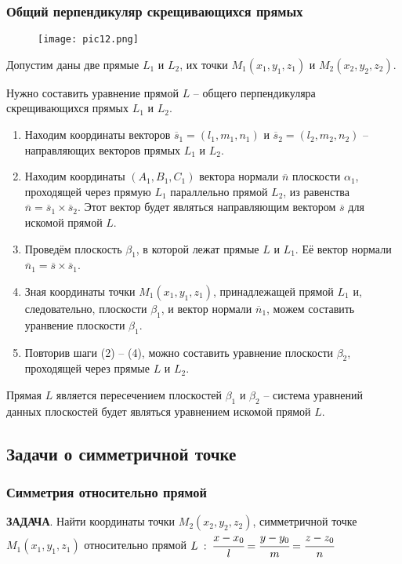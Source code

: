 \documentclass{article}
\begin{document}
\subsubsection{Общий перпендикуляр скрещивающихся прямых}
\begin{wrapfigure}{l}{0.5\textwidth}
    \centering
    \texttt{[image: pic12.png]}
\end{wrapfigure}
Допустим даны две прямые $L_1$ и $L_2$, их точки $M_1(x_1,y_1,z_1)$ и $M_2(x_2,y_2,z_2)$.

Нужно составить уравнение прямой $L$ -- общего перпендикуляра скрещивающихся прямых $L_1$ и $L_2$.
\begin{enumerate}
    \item Находим координаты векторов $\overline{s}_1=(l_1,m_1,n_1)$ и $\overline{s}_2=(l_2,m_2,n_2)$ -- направляющих векторов прямых $L_1$ и $L_2$.
    \item Находим координаты $(A_1,B_1,C_1)$ вектора нормали $\overline{n}$ плоскости $\alpha_1$, проходящей через прямую $L_1$ параллельно прямой $L_2$, из равенства $\overline{n}=\overline{s}_1\times\overline{s}_2$. Этот вектор будет являться направляющим вектором $\overline{s}$ для искомой прямой $L$.
    \item Проведём плоскость $\beta_1$, в которой лежат прямые $L$ и $L_1$. Её вектор нормали $\overline{n}_1=\overline{s}\times\overline{s}_1$.
    \item Зная координаты точки $M_1(x_1,y_1,z_1)$, принадлежащей прямой $L_1$ и, следовательно, плоскости $\beta_1$, и вектор нормали $\overline{n}_1$, можем составить уранвение плоскости $\beta_1$.
    \item Повторив шаги (2) -- (4), можно составить уравнение плоскости $\beta_2$, проходящей через прямые $L$ и $L_2$.
\end{enumerate}
Прямая $L$ является пересечением плоскостей $\beta_1$ и $\beta_2$ -- система уравнений данных плоскостей будет являться уравнением искомой прямой $L$.

\newpage
\subsection{Задачи о симметричной точке}
\subsubsection{Симметрия относительно прямой}
\textbf{ЗАДАЧА}. Найти координаты точки $M_2(x_2,y_2,z_2)$, симметричной точке $M_1(x_1,y_1,z_1)$ относительно прямой $L\::\: \cfrac{x-x_0}{l}=\cfrac{y-y_0}{m}=\cfrac{z-z_0}{n}$
\end{document}
